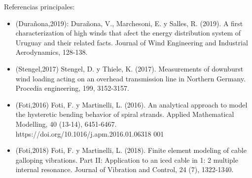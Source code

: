 \documentclass[
  aspectratio=169,
]{beamer}
\begin{document}
\begin{small}
\begin{frame}{Referencias principales:}
	\begin{itemize}
		\item {\color{blue}(Durañona,2019)}: Durañona, V., Marchesoni, E. y Salles, R. (2019). A first characterization of high winds that afect the energy distribution system of Uruguay and their related facts. Journal of Wind Engineering and Industrial Aerodynamics, 128-138.
		\item{\color{blue}(Stengel,2017)} Stengel, D. y Thiele, K. (2017). Measurements of downburst wind loading acting on an overhead transmission line in Northern Germany. Procedia engineering, 199, 3152-3157.
 		\item {\color{blue}(Foti,2016)} Foti, F. y Martinelli, L. (2016). An analytical approach to model the hysteretic bending behavior of spiral strands. Applied Mathematical Modelling, 40 (13-14), 6451-6467. https://doi.org/10.1016/j.apm.2016.01.06318 001
 		\item {\color{blue}(Foti,2018)} Foti, F. y Martinelli, L. (2018). Finite element modeling of cable galloping vibrations. Part II: Application to an iced cable in 1: 2 multiple internal resonance. Journal of Vibration and Control, 24 (7), 1322-1340.
	\end{itemize}
\end{frame}


	\end{small}
\end{document}
